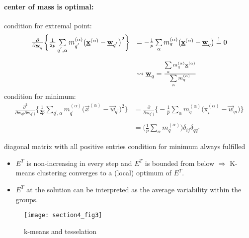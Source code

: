 \paragraph{center of mass is optimal:} condition for extremal point:
\begin{equation}
	\begin{array}{ll}
	\frac{\partial}{\partial \underline{\mathbf{w}}_q} \bigg\{ \frac{1}{2p} 
	\sum\limits_{q^{'}, \alpha} m_{q^{'}}^{(\alpha)} 
	\big( \underline{\mathbf{x}}^{(\alpha)} - \underline{\mathbf{w}}_{q^{'}} \big)^2 \bigg\}
	& = -\frac{1}{p} \sum\limits_{\alpha} m_q^{(\alpha)} 
		\big( \underline{\mathbf{x}}^{(\alpha)} - \underline{\mathbf{w}}_q \big) \stackrel{\mathrm{!}}{=} 0 \\\\
	& \leadsto \underline{\mathbf{w}}_q = \frac{\sum\limits_{\alpha} m_q^{(\alpha)}
		\underline{\mathbf{x}}^{(\alpha)}}{\sum\limits_{\alpha} m_q^{(\alpha)}}
	\end{array}
\end{equation}
condition for minimum:
\begin{equation}
	\begin{array}{ll}
	\frac{\partial^2}{\partial \mathrm{w}_{qi} \partial \mathrm{w}_{
		q^{''}j}} \bigg\{ \frac{1}{2p} \sum\limits_{q^{'}, \alpha}
		m_{q^{'}}^{(\alpha)} \big( \vec{x}^{(\alpha)} - \vec{w}_{q^{'}}
		\big)^2 \bigg\} 
	& = \frac{\partial}{\partial \mathrm{w}_{q^{''}j}} \bigg\{
		-\frac{1}{p} \sum\limits_{\alpha} m_q^{(\alpha)} 
		\big( \mathrm{x}_i^{(\alpha)} - \vec{w}_{qi}
		\big) \bigg\} \\\\
	& = \Big( \frac{1}{p} \sum\limits_{\alpha} m_q^{(\alpha)} \Big)
		\delta_{ij} \delta_{qq^{''}}
	\end{array}
\end{equation}
\begin{itemize}
	\itl diagonal matrix with all positive entries
	\itl condition for minimum always fulfilled
\end{itemize}
\begin{itemize}
\item $E^T$ is non-increasing in every step and $E^T$ is bounded from below $\Rightarrow$ K-means clustering converges to a (local) optimum of $E^T$. 
\item $E^T$ at the solution can be interpreted as the average variability
within the groups.
\end{itemize}
\begin{figure}[h!]
  \centering
  \texttt{[image: section4\_fig3]}  
  \caption{k-means and tesselation}
  \label{fig:tesselation}
\end{figure}


